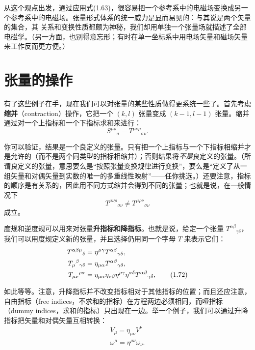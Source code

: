 从这个观点出发，通过应用式(1.63)，很容易把一个参考系中的电磁场变换成另一个参考系中的电磁场。张量形式体系的统一威力是显而易见的：与其说是两个矢量的集合，其
关系和变换性质都颇为神秘，我们却用单独一个张量场就描述了全部电磁学。（另一方面，也别得意忘形；有时在单一坐标系中用电场矢量和磁场矢量来工作反而更方便。）

\section{张量的操作}

有了这些例子在手，现在我们可以对张量的某些性质做得更系统一些了。首先考虑\textbf{缩并}（contraction）操作，它把一个 $(k,l)$ 张量变成 $(k-1,l-1)$ 张量。缩并通过对一个上指标和一个下指标求和来进行：
\begin{equation*}
S^{\mu\rho}{}_{\sigma} = T^{\mu\nu\rho}{}_{\sigma\nu}.
\tag{1.70}
\end{equation*}

你可以验证，结果是一个良定义的张量。只有把一个上指标与一个下指标相缩并才是允许的（而不是两个同类型的指标相缩并）；否则结果将\emph{不是}良定义的张量。（所谓良定义的张量，意思要么是“按照张量变换规律进行变换”，要么是“定义了从一组矢量和对偶矢量到实数的唯一的多重线性映射”——任你挑选。）还要注意，指标的顺序是有关系的，因此用不同方式缩并会得到不同的张量；也就是说，在一般情况下
\begin{equation*}
T^{\mu\nu\rho}{}_{\sigma\nu} \neq T^{\mu\rho\nu}{}_{\sigma\nu}
\tag{1.71}
\end{equation*}
成立。

度规和逆度规可以用来对张量\textbf{升指标和降指标}。也就是说，给定一个张量 $T^{\alpha\beta}{}_{\gamma\delta}$，我们可以用度规定义新的张量，并且选择仍用同一个字母 $T$ 来表示它们：
\begin{align*}
T^{\alpha\beta\mu}{}_{\delta} &= \eta^{\mu\gamma}T^{\alpha\beta}{}_{\gamma\delta},\notag\\
T_{\mu}{}^{\beta}{}_{\gamma\delta} &= \eta_{\mu\alpha}T^{\alpha\beta}{}_{\gamma\delta},\notag\\
T_{\mu\nu}{}^{\rho\sigma} &= \eta_{\mu\alpha}\eta_{\nu\beta}\eta^{\rho\gamma}\eta^{\sigma\delta}T^{\alpha\beta}{}_{\gamma\delta},
\tag{1.72}
\end{align*}

如此等等。注意，升降指标并不改变指标相对于其他指标的位置；而且还应注意，自由指标（free indices，不求和的指标）在方程两边必须相同，而哑指标（dummy indices，求和的指标）只出现在一边。举一个例子，我们可以通过升降指标把矢量和对偶矢量互相转换：
\begin{equation*}
\begin{gathered}
V_{\mu} = \eta_{\mu\nu}V^{\nu}\\
\omega^{\mu} = \eta^{\mu\nu}\omega_{\nu}.
\end{gathered}
\tag{1.73}
\end{equation*}

